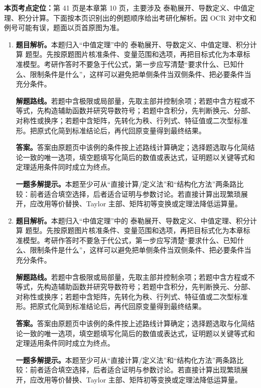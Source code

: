 \begin{solutionblock}
\textbf{本页考点定位：}第 41 页是本章第 10 页，主要涉及 泰勒展开、导数定义、中值定理、积分计算。下面按本页识别出的例题顺序给出考研化解析。因 OCR 对中文和例号可能有误，题面以页首原图为准。

\begin{enumerate}[label=\textbf{例\arabic*.}, leftmargin=2.4em]

\item \textbf{题目解析。}本题归入“中值定理”中的 泰勒展开、导数定义、中值定理、积分计算 题型。先按原题图片核准条件、变量范围和选项，再把目标式化为本章标准模型。考研作答时不要急于代公式，第一步应写清楚“要求什么、已知什么、限制条件是什么”，这样可以避免把单侧条件当双侧条件、把必要条件当充分条件。

\textbf{解题路线。}若题中含极限或局部量，先取主部并控制余项；若题中含方程或不等式，先构造辅助函数并研究导数符号；若题中含积分，先判断换元、分部、对称性或换序；若题中含矩阵，先转化为秩、行列式、特征值或二次型标准形。把原式化简到标准结论后，再代回原变量得到最终结果。

\textbf{答案。}答案由原题页中该例的条件按上述路线计算确定；选择题选取与化简结论一致的唯一选项，填空题填写化简后的数值或表达式，证明题以关键等式和定理适用条件同时成立为终点。

\textbf{一题多解提示。}本题至少可从“直接计算/定义法”和“结构化方法”两条路比较：前者适合填空选择，后者适合证明与参数讨论。若直接计算出现繁琐展开，应改用等价替换、Taylor 主部、矩阵初等变换或定理法降低运算量。

\item \textbf{题目解析。}本题归入“中值定理”中的 泰勒展开、导数定义、中值定理、积分计算 题型。先按原题图片核准条件、变量范围和选项，再把目标式化为本章标准模型。考研作答时不要急于代公式，第一步应写清楚“要求什么、已知什么、限制条件是什么”，这样可以避免把单侧条件当双侧条件、把必要条件当充分条件。

\textbf{解题路线。}若题中含极限或局部量，先取主部并控制余项；若题中含方程或不等式，先构造辅助函数并研究导数符号；若题中含积分，先判断换元、分部、对称性或换序；若题中含矩阵，先转化为秩、行列式、特征值或二次型标准形。把原式化简到标准结论后，再代回原变量得到最终结果。

\textbf{答案。}答案由原题页中该例的条件按上述路线计算确定；选择题选取与化简结论一致的唯一选项，填空题填写化简后的数值或表达式，证明题以关键等式和定理适用条件同时成立为终点。

\textbf{一题多解提示。}本题至少可从“直接计算/定义法”和“结构化方法”两条路比较：前者适合填空选择，后者适合证明与参数讨论。若直接计算出现繁琐展开，应改用等价替换、Taylor 主部、矩阵初等变换或定理法降低运算量。


\end{enumerate}
\end{solutionblock}
